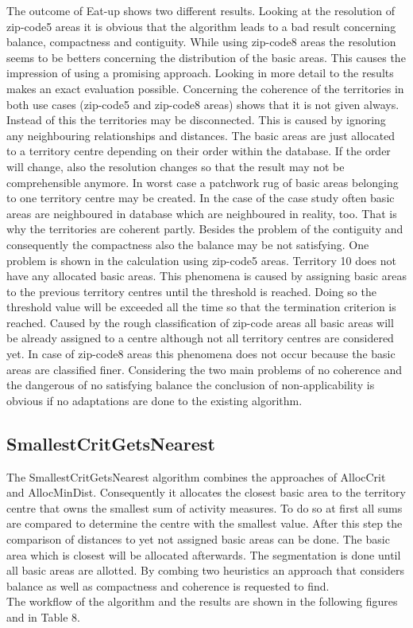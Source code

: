 The outcome of Eat-up shows two different results. Looking at the resolution of zip-code5 areas it is obvious that the algorithm leads to a bad result concerning balance, compactness and contiguity. While using zip-code8 areas the resolution seems to be betters concerning the distribution of the basic areas. This causes the impression of using a promising approach. Looking in more detail to the results makes an exact evaluation possible. Concerning the coherence of the territories in both use cases (zip-code5 and zip-code8 areas) shows that it is not given always. Instead of this the territories may be disconnected. This is caused by ignoring any neighbouring relationships and distances. The basic areas are just allocated to a territory centre depending on their order within the database. If the order will change, also the resolution changes so that the result may not be comprehensible anymore. In worst case a patchwork rug of basic areas belonging to one territory centre may be created. In the case of the case study often basic areas are neighboured in database which are neighboured in reality, too. That is why the territories are coherent partly. Besides the problem of the contiguity and consequently the compactness also the balance may be not satisfying. One problem is shown in the calculation using zip-code5 areas. Territory 10 does not have any allocated basic areas. This phenomena is caused by assigning basic areas to the previous territory centres until the threshold is reached. Doing so the threshold value will be exceeded all the time so that the termination criterion is reached. Caused by the rough classification of zip-code areas all basic areas will be already assigned to a centre although not all territory centres are considered yet. In case of zip-code8 areas this phenomena does not occur because the basic areas are classified finer. Considering the two main problems of no coherence and the dangerous of no satisfying balance the conclusion of non-applicability is obvious if no adaptations are done to the existing algorithm.
 

\subsection{SmallestCritGetsNearest}

The SmallestCritGetsNearest algorithm combines the approaches of AllocCrit and AllocMinDist. Consequently it allocates the closest basic area to the territory centre that owns the smallest sum of activity measures. To do so at first all sums are compared to determine the centre with the smallest value. After this step the comparison of distances to yet not assigned basic areas can be done. The basic area which is closest will be allocated afterwards. The segmentation is done until all basic areas are allotted. By combing two heuristics an approach that considers balance as well as compactness and coherence is requested to find.\\
The workflow of the algorithm and the results are shown in the following figures and in Table 8.


